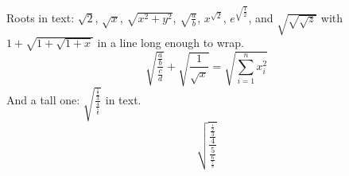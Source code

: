 \documentclass[12pt]{article}
\begin{document}
Roots in text: $\sqrt{2}$, $\sqrt x$, $\sqrt{x^2+y^2}$, $\sqrt{\frac{a}{b}}$, $x^{\sqrt{2}}$, $e^{\sqrt{\frac{1}{2}}}$,
and $\sqrt{\sqrt{\sqrt{z}}}$ with $1+\sqrt{1+\sqrt{1+x}}$ in a line long enough to wrap.
\[ \sqrt{\frac{\frac{a}{b}}{\frac{c}{d}}} + \sqrt{\frac{1}{\sqrt{x}}} = \sqrt{\sum_{i=1}^n x_i^2} \]
And a tall one: $\sqrt{\frac{\frac{\frac{1}{2}}{3}}{\frac{4}{\frac{5}{6}}}}$ in text.
\[ \sqrt{\frac{\frac{\frac{\frac{1}{2}}{3}}{4}}{\frac{5}{\frac{6}{\frac{7}{8}}}}} \]
\end{document}
